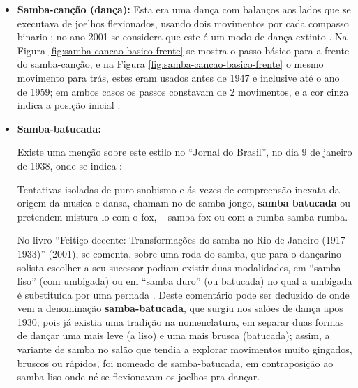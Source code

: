 \begin{itemize}

\item \textbf{Samba-canção (dança):}
Esta era uma dança com balanços aos lados que se executava de joelhos flexionados,
usando dois movimentos por cada compasso binario \cite[pp. 58]{freitas1959danca} 
\cite[pp. 51]{fornaciari1947aprender} \cite[pp. 143]{perna2002samba}; 
no ano 2001 se considera que este é um modo de dança extinto \cite[pp. 143]{perna2002samba}.
Na Figura \ref{fig:samba-cancao-basico-frente} se mostra o passo básico para a frente do samba-canção,
e na  Figura \ref{fig:samba-cancao-basico-frente} o mesmo movimento para trás,
estes eram usados antes de 1947 e inclusive até o ano de 1959;
em ambos casos os passos constavam de 2 movimentos, e a cor cinza indica a posição inicial \cite[pp. 51]{fornaciari1947aprender} \cite[pp. 59-60]{freitas1959danca}. 



\item \textbf{Samba-batucada:}

Existe uma menção sobre este estilo no ``Jornal do Brasil'', no dia 9 de janeiro de 1938,
onde se indica \cite[pp. 4]{musicasambavariasdef1}:
\begin{citando}%
Tentativas isoladas de puro 
snobismo e ás vezes de compreensão 
inexata da origem da 
musica e dansa, chamam-no de samba jongo, \textbf{samba batucada} ou
pretendem mistura-lo com o fox, -- samba fox ou com a rumba samba-rumba.
\end{citando}



No livro ``Feitiço decente: Transformações do samba no Rio de Janeiro (1917-1933)'' (2001),
se comenta, sobre uma roda do samba, que para o dançarino solista  escolher a seu sucessor podiam
existir duas modalidades, em ``samba liso'' (com umbigada) ou em ``samba duro'' 
(ou batucada) no qual a umbigada é substituída por uma pernada \cite[pp. 109]{sandroni2001feitico}.
Deste comentário pode ser deduzido de onde vem a denominação \textbf{samba-batucada}, 
que surgiu nos salões de dança apos 1930; pois já existia uma tradição na nomenclatura,
em separar duas formas de dançar uma mais leve (a liso) e uma mais brusca (batucada);
assim, a variante de samba no salão que tendia a explorar movimentos muito  gingados, bruscos ou rápidos,
foi nomeado de samba-batucada, em contraposição ao samba liso onde né se flexionavam os joelhos pra dançar.  




\end{itemize}
